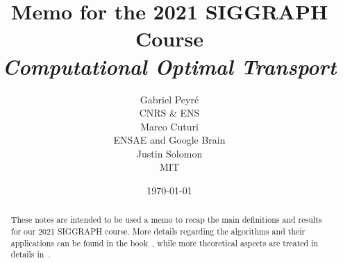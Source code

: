 \documentclass[10pt]{article}
\title{Memo for the 2021 SIGGRAPH Course\\ \textit{Computational Optimal Transport}}
\author{%
\begin{tabular}{c}
	Gabriel Peyr{\'e} \\ CNRS \& ENS \\
\end{tabular}
\begin{tabular}{c}
	Marco Cuturi \\ ENSAE and Google Brain
\end{tabular}
\begin{tabular}{c}
	Justin Solomon  \\ MIT
\end{tabular}
}
\date{\today}
\begin{document}
\maketitle

\begin{abstract}
	These notes are intended to be used a memo to recap the main definitions and results for our 2021 SIGGRAPH course.
	More details regarding the algorithms and their applications can be found in the book~\cite{peyre2019computational}, while more theoretical aspects are treated
	in details in~\cite{SantambrogioBook}.   
\end{abstract}

\tableofcontents







%
%
%
%
%
%






\end{document}
